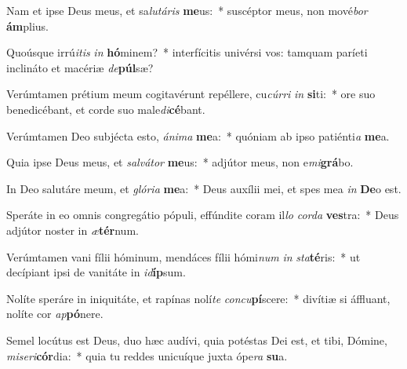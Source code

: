 \item Nam et ipse Deus meus, et sa\textit{lu}\textit{tá}\textit{ris} \textbf{me}us:~* suscéptor meus, non mové\textit{bor} \textbf{ám}plius.
\item Quoúsque irrú\textit{i}\textit{tis} \textit{in} \textbf{hó}minem?~* interfícitis univérsi vos: tamquam paríeti inclináto et macériæ \textit{de}\textbf{púl}sæ?
\item Verúmtamen prétium meum cogitavérunt repéllere, cu\textit{cúr}\textit{ri} \textit{in} \textbf{si}ti:~* ore suo benedicébant, et corde suo male\textit{di}\textbf{cé}bant.
\item Verúmtamen Deo subjécta esto, \textit{á}\textit{ni}\textit{ma} \textbf{me}a:~* quóniam ab ipso patiénti\textit{a} \textbf{me}a.
\item Quia ipse Deus meus, et \textit{sal}\textit{vá}\textit{tor} \textbf{me}us:~* adjútor meus, non e\textit{mi}\textbf{grá}bo.
\item In Deo salutáre meum, et \textit{gló}\textit{ri}\textit{a} \textbf{me}a:~* Deus auxílii mei, et spes mea \textit{in} \textbf{De}o est.
\item Speráte in eo omnis congregátio pópuli, effúndite coram il\textit{lo} \textit{cor}\textit{da} \textbf{ves}tra:~* Deus adjútor noster in \textit{æ}\textbf{tér}num.
\item Verúmtamen vani fílii hóminum, mendáces fílii hómi\textit{num} \textit{in} \textit{sta}\textbf{té}ris:~* ut decípiant ipsi de vanitáte in \textit{id}\textbf{íp}sum.
\item Nolíte speráre in iniquitáte, et rapínas nolí\textit{te} \textit{con}\textit{cu}\textbf{pí}scere:~* divítiæ si áffluant, nolíte cor \textit{ap}\textbf{pó}nere.
\item Semel locútus est Deus, duo hæc audívi, quia potéstas Dei est, et tibi, Dómine, \textit{mi}\textit{se}\textit{ri}\textbf{cór}dia:~* quia tu reddes unicuíque juxta ópe\textit{ra} \textbf{su}a.

